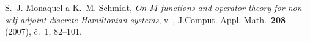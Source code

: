\begin{thebibliography}{10}

S.~J. Monaquel a K.~M. Schmidt, \textit{On $M$-functions and operator
  theory for non-self-adjoint discrete Hamiltonian systems}, v~, J.Comput. Appl. 
  Math.~\textbf{208} (2007), \v{c}.~1, 82--101.

    
\end{thebibliography}

\cleardoublepage
